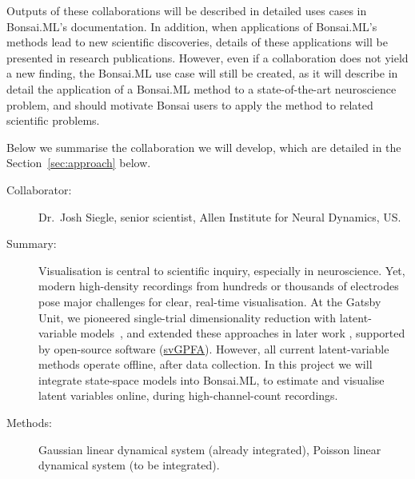 Outputs of these collaborations will be described in detailed uses cases in
Bonsai.ML's documentation.
%
In addition, when applications of Bonsai.ML's methods lead to new scientific
discoveries, details of these applications will be presented in research
publications.
%
However, even if a collaboration does not yield a new finding, the Bonsai.ML
use case will still be created, as it will describe in detail the application
of a Bonsai.ML method to a state-of-the-art neuroscience problem, and should
motivate Bonsai users to apply the method to related scientific problems.

Below we summarise the collaboration we will develop, which are detailed in the
Section~\ref{sec:approach} below.


\begin{description}

    \item[Collaborator:] Dr.~Josh Siegle, senior scientist, Allen Institute for
Neural Dynamics, US.

    \item[Summary:]

        Visualisation is central to scientific inquiry, especially in
        neuroscience. Yet, modern high-density recordings from hundreds or
        thousands of electrodes pose major challenges for clear, real-time
        visualisation. At the Gatsby Unit, we pioneered single-trial
        dimensionality reduction with latent-variable models~\citep{yuEtAl09},
        and extended these approaches in later work
        \citep[e.g.,][]{dunckerAndSahani18}, supported by open-source software
        (\href{https://github.com/joacorapela/svGPFA}{svGPFA}).  However, all
        current latent-variable methods operate offline, after data collection.
        In this project we will integrate state-space models into Bonsai.ML, to
        estimate and visualise latent variables online, during
        high-channel-count recordings.

    \item[Methods:] Gaussian linear dynamical system (already integrated),
Poisson linear dynamical system (to be integrated).

\end{description}



